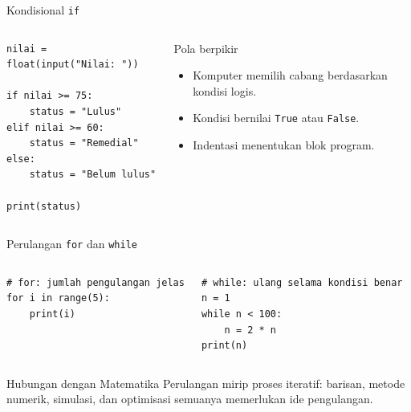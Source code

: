 \documentclass[aspectratio=169,11pt]{beamer}
\begin{document}
\begin{frame}[fragile]{Kondisional \texttt{if}}
\begin{columns}[T]
\begin{lstlisting}[style=py]
nilai = float(input("Nilai: "))

if nilai >= 75:
    status = "Lulus"
elif nilai >= 60:
    status = "Remedial"
else:
    status = "Belum lulus"

print(status)
\end{lstlisting}
\begin{block}{Pola berpikir}
\begin{itemize}
  \item Komputer memilih cabang berdasarkan kondisi logis.
  \item Kondisi bernilai \texttt{True} atau \texttt{False}.
  \item Indentasi menentukan blok program.
\end{itemize}
\end{block}
\end{columns}
\end{frame}

\begin{frame}[fragile]{Perulangan \texttt{for} dan \texttt{while}}
\begin{columns}[T]
\begin{lstlisting}[style=py]
# for: jumlah pengulangan jelas
for i in range(5):
    print(i)
\end{lstlisting}
\begin{lstlisting}[style=py]
# while: ulang selama kondisi benar
n = 1
while n < 100:
    n = 2 * n
print(n)
\end{lstlisting}
\end{columns}
\begin{block}{Hubungan dengan Matematika}
Perulangan mirip proses iteratif: barisan, metode numerik, simulasi, dan optimisasi semuanya memerlukan ide pengulangan.
\end{block}
\end{frame}
\end{document}

